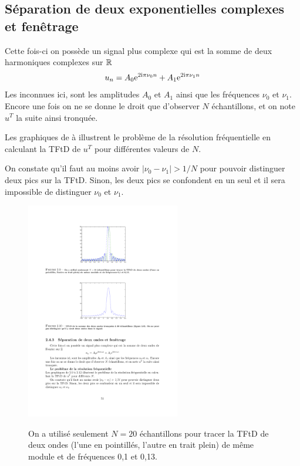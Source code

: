 \begin{definition}
\subsection{S\'{e}paration de deux exponentielles complexes et fen\^{e}trage}
Cette fois-ci on poss\`{e}de un signal plus complexe qui est la somme de deux harmoniques complexes sur $\mathbb{R}$
$$
u_{n}=A_{0}\mathrm{e}^{2\mathrm{i}\pi\nu_{0}n}+A_{1}\mathrm{e}^{2\mathrm{i}\pi\nu_{1}n}
$$
Les inconnues ici, sont les amplitudes $A_{0}$ et $A_{1}$ ainsi que les fr\'{e}quences $\nu_{0}$ et $\nu_{1}$. Encore une fois on ne se donne le droit que d'observer $N$ \'{e}chantillons, et on note $u^{T}$ la suite ainsi tronqu\'{e}e.


Les graphiques de  \`{a}  illustrent le probl\`{e}me de la r\'{e}solution fr\'{e}quentielle en calculant la TFtD de $u^{T}$ pour diff\'{e}rentes valeurs de $N$.

On constate qu'il faut au moins avoir $|\nu_{0}-\nu_{1}|>1/N$ pour pouvoir distinguer deux pics sur la TFtD. Sinon, les deux pics se confondent en un seul et il sera impossible de distinguer $\nu_{0}$ et $\nu_{1}.$

\begin{figure}
  \centering
  \includegraphics[width=0.6\textwidth]{Figures/Figure2-9}\\
  \caption{On a utilis\'{e} seulement $N=20$ \'{e}chantillons pour tracer la TFtD de deux ondes (l'une en pointill\'{e}s, l'autre en trait plein) de m\^{e}me module et de fr\'{e}quences 0,1 et 0,13.}\label{fig:figure2-9}
\end{figure}


\end{definition}
